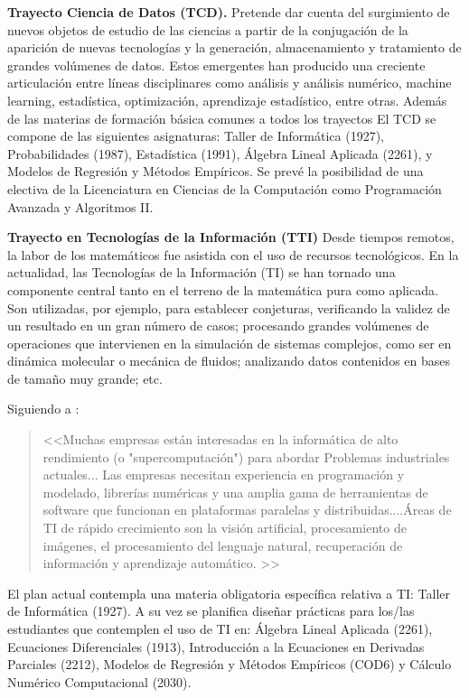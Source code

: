 \documentclass[a4paper, 12pt]{article}
\begin{document}
\begin{description}
\item{\textbf{Trayecto Ciencia de Datos (TCD).}}   Pretende dar cuenta del surgimiento de nuevos objetos de estudio de las ciencias a partir de la conjugación de la aparición de nuevas tecnologías y la generación, almacenamiento y tratamiento de grandes volúmenes de datos. Estos emergentes han producido una creciente articulación entre líneas disciplinares como análisis y análisis numérico, machine learning, estadística, optimización, aprendizaje
estadístico, entre otras. Además de las materias de formación básica comunes a todos los trayectos El TCD se compone de las siguientes asignaturas: Taller de Informática (1927), Probabilidades (1987), Estadística (1991), Álgebra Lineal Aplicada (2261),  y Modelos de Regresión y Métodos Empíricos.  Se prevé la posibilidad de una electiva  de la Licenciatura en Ciencias de la Computación como Programación Avanzada y Algoritmos II. 




\item{\textbf{Trayecto en Tecnologías de la Información (TTI)}}  Desde tiempos remotos, la labor de los matemáticos fue asistida con el uso de  recursos tecnológicos. En la actualidad,  las Tecnologías de la Información (TI) se han tornado una componente central tanto en el terreno de la matemática pura como aplicada. Son utilizadas, por ejemplo, para establecer conjeturas, verificando la validez de un resultado en un gran número de casos; procesando grandes volúmenes de operaciones que intervienen en la simulación de sistemas complejos, como ser en dinámica molecular o mecánica de fluidos; analizando datos contenidos en bases de tamaño muy grande; etc. 

Siguiendo a \cite{society2012siam}: 
\begin{quote}
<<Muchas empresas están interesadas en la informática de alto rendimiento (o "supercomputación") para abordar 
Problemas industriales actuales... Las empresas necesitan experiencia en programación y modelado, librerías numéricas
 y una amplia gama de herramientas de software que funcionan en plataformas paralelas y distribuidas....Áreas de TI de rápido crecimiento son la visión artificial, procesamiento de imágenes, el procesamiento del lenguaje natural, recuperación de información y aprendizaje automático. >>
\end{quote}

El plan actual contempla una materia obligatoria específica  relativa a TI: Taller de Informática (1927).  A su vez se planifica diseñar prácticas para los/las estudiantes que contemplen el uso de TI en:  Álgebra Lineal Aplicada (2261), Ecuaciones Diferenciales (1913), Introducción a la Ecuaciones en Derivadas Parciales (2212), Modelos de Regresión y Métodos Empíricos (COD6) y Cálculo Numérico Computacional (2030). 



\end{description}
\end{document}

